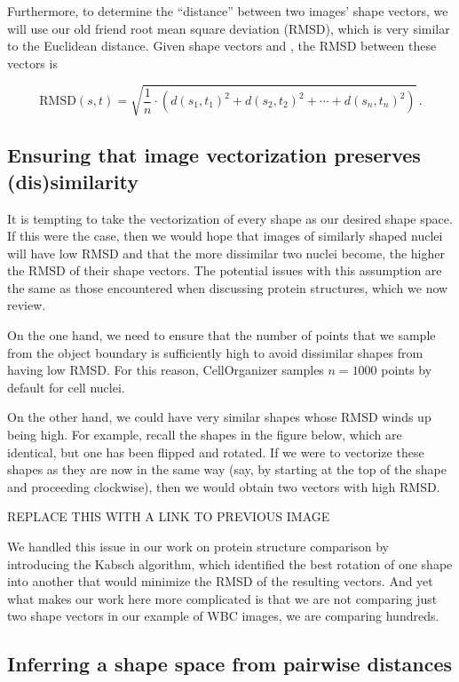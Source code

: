 Furthermore, to determine the ``distance'' between two images' shape vectors, we will use our old friend root mean square deviation (RMSD), which is very similar to the Euclidean distance. Given shape vectors  and , the RMSD between these vectors is

$$\text{RMSD}(s, t) = \sqrt{\dfrac{1}{n} \cdot (d(s_1, t_1)^2 + d(s_2, t_2)^2 + \cdots + d(s_n, t_n)^2)}\,. $$

\FloatBarrier
{}
\subsection{Ensuring that image vectorization preserves (dis)similarity}

It is tempting to take the vectorization of every shape as our desired shape space. If this were the case, then we would hope that images of similarly shaped nuclei will have low RMSD and that the more dissimilar two nuclei become, the higher the RMSD of their shape vectors. The potential issues with this assumption are the same as those encountered when discussing protein structures, which we now review.

On the one hand, we need to ensure that the number of points that we sample from the object boundary is sufficiently high to avoid dissimilar shapes from having low RMSD. For this reason, CellOrganizer samples $n = 1000$ points by default for cell nuclei.

On the other hand, we could have very similar shapes whose RMSD winds up being high. For example, recall the shapes in the figure below, which are identical, but one has been flipped and rotated. If we were to vectorize these shapes as they are now in the same way (say, by starting at the top of the shape and proceeding clockwise), then we would obtain two vectors with high RMSD.

REPLACE THIS WITH A LINK TO PREVIOUS IMAGE

We handled this issue in our work on protein structure comparison by introducing the Kabsch algorithm, which identified the best rotation of one shape into another that would minimize the RMSD of the resulting vectors. And yet what makes our work here more complicated is that we are not comparing just two shape vectors in our example of WBC images, we are comparing hundreds.

\FloatBarrier
{}
\subsection{Inferring a shape space from pairwise distances}

